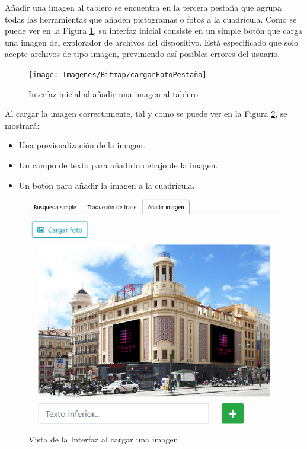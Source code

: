 Añadir una imagen al tablero se encuentra en la tercera pestaña que agrupa todas las herramientas que añaden pictogramas o fotos a la cuadrícula. Como se puede ver en la Figura \ref{fig:cargarfotopestana}, su interfaz inicial consiste en un simple botón que carga una imagen del explorador de archivos del dispositivo. Está especificado que solo acepte archivos de tipo imagen, previniendo así posibles errores del usuario. 

\begin{figure}[h!]
	\centering
	\texttt{[image: Imagenes/Bitmap/cargarFotoPestaña]}
	\caption{Interfaz inicial al añadir una imagen al tablero}
	\label{fig:cargarfotopestana}
\end{figure}


Al cargar la imagen correctamente, tal y como se puede ver en la Figura \ref{fig:addphotoitem}, se mostrará: 

\begin{itemize}
	\item Una previsualización de la imagen.
	\item Un campo de texto para añadirlo debajo de la imagen.
	\item Un botón para añadir la imagen a la cuadrícula.
\end{itemize}

\begin{figure}[h!]
	\centering
	\includegraphics[width=0.7\linewidth]{Imagenes/Bitmap/addPhotoItem}
	\caption{ Vista de la Interfaz al cargar una imagen}
	\label{fig:addphotoitem}
\end{figure}



